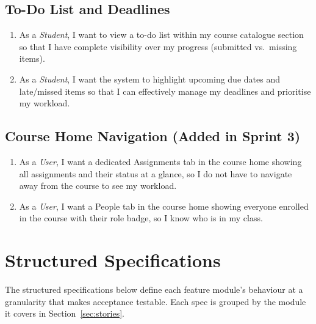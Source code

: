 \documentclass[12pt, a4paper]{article}
\begin{document}
\subsection{To-Do List and Deadlines}
\begin{enumerate}[label=\textbf{US\,\arabic*}, start=23]
  \item As a \emph{Student}, I want to view a to-do list within my course
        catalogue section so that I have complete visibility over my progress
        (submitted vs.\ missing items).
  \item As a \emph{Student}, I want the system to highlight upcoming due dates
        and late/missed items so that I can effectively manage my deadlines and
        prioritise my workload.
\end{enumerate}

\subsection{Course Home Navigation \texorpdfstring{\normalfont\small(Added in Sprint 3)}{}}
\begin{enumerate}[label=\textbf{US\,\arabic*}, start=25]
  \item As a \emph{User}, I want a dedicated Assignments tab in the course
        home showing all assignments and their status at a glance, so I do
        not have to navigate away from the course to see my workload.
  \item As a \emph{User}, I want a People tab in the course home showing
        everyone enrolled in the course with their role badge, so I know who
        is in my class.
\end{enumerate}

\section{Structured Specifications}
\label{sec:specs}

The structured specifications below define each feature module's behaviour at
a granularity that makes acceptance testable. Each spec is grouped by the
module it covers in Section~\ref{sec:stories}.
\end{document}
